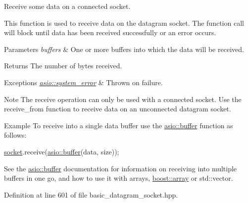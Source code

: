 Receive some data on a connected socket. 

This function is used to receive data on the datagram socket. The function call will block until data has been received successfully or an error occurs.


\begin{DoxyParams}{Parameters}
{\em buffers} & One or more buffers into which the data will be received.\\
\hline
\end{DoxyParams}
\begin{DoxyReturn}{Returns}
The number of bytes received.
\end{DoxyReturn}

\begin{DoxyExceptions}{Exceptions}
{\em \hyperlink{classasio_1_1system__error}{asio\+::system\+\_\+error}} & Thrown on failure.\\
\hline
\end{DoxyExceptions}
\begin{DoxyNote}{Note}
The receive operation can only be used with a connected socket. Use the receive\+\_\+from function to receive data on an unconnected datagram socket.
\end{DoxyNote}
\begin{DoxyParagraph}{Example}
To receive into a single data buffer use the \hyperlink{group__buffer}{asio\+::buffer} function as follows\+: 
\begin{DoxyCode}
\hyperlink{namespacewebsocketpp_1_1transport_1_1asio_1_1socket_1_1error_a828ddaa5ed63a761e1b557465a35f05aa0c31b356014843e1d09514e794a539a7}{socket}.receive(\hyperlink{group__buffer_ga1ed66e401559cbfd19595392f653b47c}{asio::buffer}(data, size)); 
\end{DoxyCode}
 See the \hyperlink{group__buffer}{asio\+::buffer} documentation for information on receiving into multiple buffers in one go, and how to use it with arrays, \hyperlink{classboost_1_1array}{boost\+::array} or std\+::vector. 
\end{DoxyParagraph}


Definition at line 601 of file basic\+\_\+datagram\+\_\+socket.\+hpp.

\hypertarget{classasio_1_1basic__datagram__socket_a81e8691c9427005419fb0bde116566eb}{}
